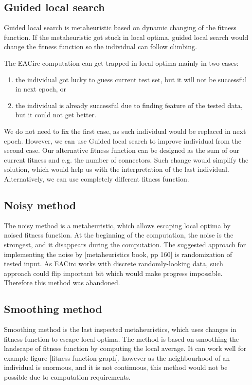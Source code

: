 \documentclass[
  print, %
  Table,   %
  nolof,     %
  nolot,     %
  11pt, %
  oneside  %
]{fithesis3}
\begin{document}
\subsection{Guided local search}

Guided local search is metaheuristic based on dynamic changing of the fitness function. If the metaheuristic got stuck in local optima, guided local search would change the fitness function so the individual can follow climbing.

The EACirc computation can get trapped in local optima mainly in two cases:

\begin{enumerate}
    \item the individual got lucky to guess current test set, but it will not be successful in next epoch, or
    \item the individual is already successful due to finding feature of the tested data, but it could not get better.
\end{enumerate}

We do not need to fix the first case, as such individual would be replaced in next epoch. However, we can use Guided local search to improve individual from the second case. Our alternative fitness function can be designed as the sum of our current fitness and e.g. the number of connectors. Such change would simplify the solution, which would help us with the interpretation of the last individual. Alternatively, we can use completely different fitness function.

\subsection{Noisy method}

The noisy method is a metaheuristic, which allows escaping local optima by noised fitness function. At the beginning of the computation, the noise is the strongest, and it disappears during the computation. The suggested approach for implementing the noise by [metaheuristics book, pp 160] is randomization of tested input. As EACirc works with discrete randomly-looking data, such approach could flip important bit which would make progress impossible. Therefore this method was abandoned.

\subsection{Smoothing method}

Smoothing method is the last inspected metaheuristics, which uses changes in fitness function to escape local optima. The method is based on smoothing the landscape of fitness function by computing the local average. It can work well for example figure [fitness function graph], however as the neighbourhood of an individual is enormous, and it is not continuous, this method would not be possible due to computation requirements.
\end{document}
